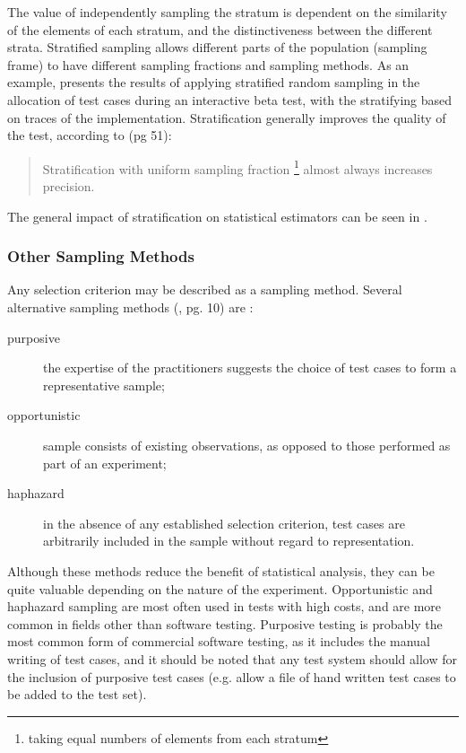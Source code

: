 The value of independently sampling the stratum
is dependent on the similarity of the elements of each stratum,
and the distinctiveness between the different strata.
Stratified sampling allows different parts of the population (sampling frame)
to have different sampling fractions and sampling methods.
As an example, 
\cite{Podgurski1999} presents the results of applying
stratified random sampling in the allocation of test cases
during an interactive beta test,
with the stratifying based on traces of the implementation.
Stratification generally improves the quality of the test,
according to \cite{Stuart1968} (pg 51):

\begin{quote}
 Stratification with uniform sampling fraction
 \footnote{taking equal numbers of elements from each stratum}
 almost always increases precision.
 \end{quote}
 
 \noindent 
The general impact of stratification on statistical estimators 
can be seen in \cite{Cochran1977}.

\subsubsection{Other Sampling Methods}

Any selection criterion may be described as a sampling method.
Several alternative sampling methods (\cite{Cochran1977}, pg. 10) are :

\begin{description}
\item[purposive] the expertise of the practitioners suggests 
the choice of test cases to form a representative sample;
\item[opportunistic] sample consists of existing observations,
as opposed to those performed as part of an experiment;
\item[haphazard] in the absence of any established selection criterion,
test cases are arbitrarily included in the sample
without regard to representation.
\end{description}

\noindent
Although these methods reduce the benefit of statistical analysis,
they can be quite valuable depending on the nature of the experiment.
Opportunistic and haphazard sampling are most often used in tests with high costs,
and are more common in fields other than software testing.
Purposive testing is probably the most common form of commercial software testing,
as it includes the manual writing of test cases,
and it should be noted that any test system should allow for the inclusion of purposive test cases
(e.g. allow a file of hand written test cases to be added to the test set).

